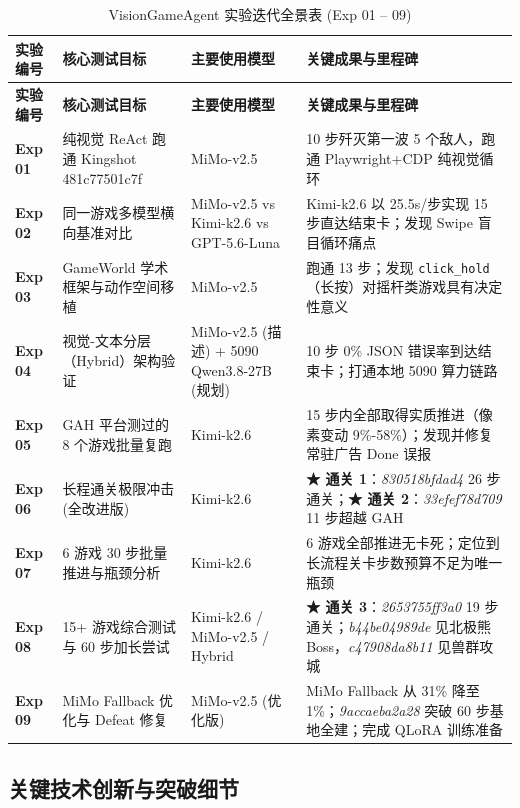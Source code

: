 \documentclass[11pt,a4paper]{ctexart}
\begin{document}
\begin{longtable}{p{2.0cm}p{3.2cm}p{3.5cm}p{4.5cm}}
\caption{VisionGameAgent 实验迭代全景表 (Exp 01 -- 09)} \label{tab:exp_all} \\
\toprule
\textbf{实验编号} & \textbf{核心测试目标} & \textbf{主要使用模型} & \textbf{关键成果与里程碑} \\
\midrule
\endfirsthead
\toprule
\textbf{实验编号} & \textbf{核心测试目标} & \textbf{主要使用模型} & \textbf{关键成果与里程碑} \\
\midrule
\endhead
\bottomrule
\endfoot
\textbf{Exp 01} & 纯视觉 ReAct 跑通 Kingshot 481c77501c7f & MiMo-v2.5 & 10 步歼灭第一波 5 个敌人，跑通 Playwright+CDP 纯视觉循环 \\
\textbf{Exp 02} & 同一游戏多模型横向基准对比 & MiMo-v2.5 vs Kimi-k2.6 vs GPT-5.6-Luna & Kimi-k2.6 以 25.5s/步实现 15 步直达结束卡；发现 Swipe 盲目循环痛点 \\
\textbf{Exp 03} & GameWorld 学术框架与动作空间移植 & MiMo-v2.5 & 跑通 13 步；发现 \texttt{click\_hold}（长按）对摇杆类游戏具有决定性意义 \\
\textbf{Exp 04} & 视觉-文本分层（Hybrid）架构验证 & MiMo-v2.5 (描述) + 5090 Qwen3.8-27B (规划) & 10 步 0\% JSON 错误率到达结束卡；打通本地 5090 算力链路 \\
\textbf{Exp 05} & GAH 平台测过的 8 个游戏批量复跑 & Kimi-k2.6 & 15 步内全部取得实质推进（像素变动 9\%-58\%）；发现并修复常驻广告 Done 误报 \\
\textbf{Exp 06} & 长程通关极限冲击 (全改进版) & Kimi-k2.6 & \textbf{★ 通关 1}：\textit{830518bfdad4} 26 步通关；\textbf{★ 通关 2}：\textit{33efef78d709} 11 步超越 GAH \\
\textbf{Exp 07} & 6 游戏 30 步批量推进与瓶颈分析 & Kimi-k2.6 & 6 游戏全部推进无卡死；定位到长流程关卡步数预算不足为唯一瓶颈 \\
\textbf{Exp 08} & 15+ 游戏综合测试与 60 步加长尝试 & Kimi-k2.6 / MiMo-v2.5 / Hybrid & \textbf{★ 通关 3}：\textit{2653755ff3a0} 19 步通关；\textit{b44be04989de} 见北极熊 Boss，\textit{c47908da8b11} 见兽群攻城 \\
\textbf{Exp 09} & MiMo Fallback 优化与 Defeat 修复 & MiMo-v2.5 (优化版) & MiMo Fallback 从 31\% 降至 1\%；\textit{9accaeba2a28} 突破 60 步基地全建；完成 QLoRA 训练准备 \\
\end{longtable}

\subsection{关键技术创新与突破细节}
\end{document}
